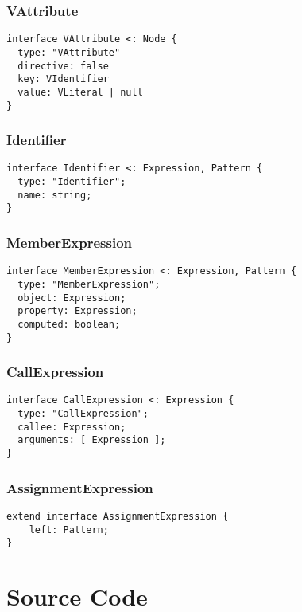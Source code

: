 \subsubsection{VAttribute}
\label{eslint:VAttribute}
\begin{lstlisting}
interface VAttribute <: Node {
  type: "VAttribute"
  directive: false
  key: VIdentifier
  value: VLiteral | null
}
\end{lstlisting}

\subsubsection{Identifier}
\label{eslint:identifier}
\begin{lstlisting}
interface Identifier <: Expression, Pattern {
  type: "Identifier";
  name: string;
}
\end{lstlisting}

\subsubsection{MemberExpression}
\label{eslint:member_expression}
\begin{lstlisting}
interface MemberExpression <: Expression, Pattern {
  type: "MemberExpression";
  object: Expression;
  property: Expression;
  computed: boolean;
} 
\end{lstlisting}

\subsubsection{CallExpression}
\label{eslint:call_expression}

\begin{lstlisting}
interface CallExpression <: Expression {
  type: "CallExpression";
  callee: Expression;
  arguments: [ Expression ];
}
\end{lstlisting}

\subsubsection{AssignmentExpression}
\label{eslint:AssignmentExpression}
\begin{lstlisting}
extend interface AssignmentExpression {
    left: Pattern;
}
\end{lstlisting}


\section{Source Code}
